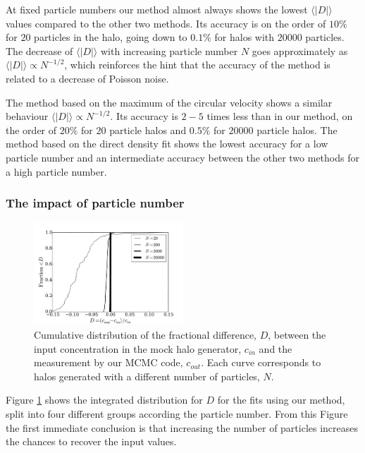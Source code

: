 \documentclass{emulateapj}
\newcommand{\avg}[1]{\langle{#1}\rangle}
\begin{document}
At fixed particle numbers our method almost always shows the lowest
$\avg{|D|}$ values compared to the other two methods.
Its accuracy is on the order of $10\%$ for $20$ particles in the halo,
going down to $0.1\%$ for halos with $20000$ particles.
The decrease of $\avg{|D|}$ with increasing particle number $N$ goes
approximately as $\avg{|D|}\propto N^{-1/2}$, which reinforces the hint that
the accuracy of the method is related to a decrease of Poisson
noise.

The method based on the maximum of the circular velocity shows a similar
behaviour $\avg{|D|}\propto N^{-1/2}$. Its accuracy is $2-5$ times less
than in our method, on the order of $20\%$ for $20$ particle halos and
$0.5\%$ for $20000$ particle halos. The method based on the direct density
fit shows the lowest accuracy for a low particle number and an intermediate
accuracy between the other two methods for a high particle number.


\subsubsection{The impact of particle number}

\begin{figure}
\begin{center}
  \includegraphics[width=0.50\textwidth]{mock_percentual_diff.pdf}
\end{center}
\caption{Cumulative distribution of the fractional difference, $D$, between
  the input concentration in the mock halo generator, $c_{in}$ and the
  measurement by our MCMC code, $c_{out}$. Each curve corresponds to
  halos generated with a different number of particles, $N$.
    \label{fig:results_mocks}}
\end{figure}

Figure \ref{fig:results_mocks} shows the integrated distribution for
$D$ for the fits using our method, split into four different groups
according the particle number.
From this Figure the first immediate
conclusion is that increasing the number of particles increases the
chances to recover the input values.
\end{document}
